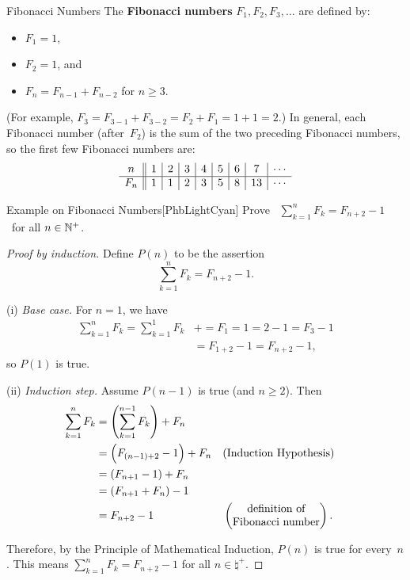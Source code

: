 \documentclass[../MATH-2000-Notes.tex]{subfiles}
\begin{document}
\begin{Definition}
    {Fibonacci Numbers}
    The \textbf{Fibonacci numbers} $F_1,F_2,F_3,\ldots$ are defined by:
    \begin{itemize}
        \item $F_1 = 1$,
        \item $F_2 = 1$,
              and
        \item $F_n = F_{n-1} + F_{n-2}$ for $n \ge 3$.
    \end{itemize}
    (For example, $F_3 = F_{3-1} + F_{3-2} = F_2 + F_1 = 1 + 1 = 2$.)
    In general, each Fibonacci number (after~$F_2$) is the sum of the two preceding Fibonacci numbers, so
    the first few Fibonacci numbers are:
    $$\begin{array}{c||c|c|c|c|c|c|c|c}
            n   & 1 & 2 & 3 & 4 & 5 & 6 & 7  & \cdots \\
            \noalign{\hrule}
            F_n & 1 & 1 & 2 & 3 & 5 & 8 & 13 & \cdots
        \end{array}$$
\end{Definition}

\begin{commentbox}{Example on Fibonacci Numbers}[{PhbLightCyan}]
    Prove \ $\displaystyle \sum\limits_{k=1}^n F_k = F_{n+2} - 1$ \ for all $n \in \mathbb{N}^+$.
\end{commentbox}
\begin{proof}[Proof by induction]
    Define $P(n)$ to be the assertion
    $$ \sum_{k=1}^n F_k = F_{n+2} - 1 .$$

    \medskip

    (i) \emph{Base case.} For $n = 1$, we have
    $$ 
    \begin{aligned}
        \sum_{k=1}^n F_k = \sum_{k=1}^1 F_k &+= F_1 = 1 = 2 - 1 = F_3 - 1 
        \\&= F_{1+2} - 1 = F_{n+2} - 1,
    \end{aligned}
    $$
    so $P(1)$ is true.

    \medskip
    (ii) \emph{Induction step.} Assume $P(n-1)$ is true (and $n \ge 2$). Then
    \begin{align*}
        \sum_{k=1}^n F_k
         & = \left( \sum_{k=1}^{n-1} F_k \right) + F_n
        \\&= \Bigl( F_{(n-1)+2} - 1 \Bigr) + F_n && \text{(Induction Hypothesis)}
        \\&= (F_{n+1} - 1) + F_n
        \\&= (F_{n+1} + F_n) - 1
        \\&= F_{n+2} - 1
         &                                             & \begin{pmatrix} \text{definition of} \\ \text{Fibonacci number} \end{pmatrix}
        .\end{align*}

    \medskip
    Therefore, by the Principle of Mathematical Induction, $P(n)$ is true for every~$n$. This means
    $\displaystyle \sum\limits_{k=1}^n F_k = F_{n+2} - 1$ for all $n \in \natural^+$.
\end{proof}
\newpage
\end{document}
